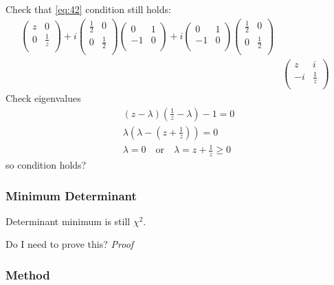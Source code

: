\documentclass[11pt,a4paper]{article}
\numberwithin{equation}{section}
\begin{document}
	Check that \ref{eq:42} condition still holds:
	\begin{align*}
	\begin{pmatrix}
	z & 0  \\
	0 & \frac{1}{z}\\
	\end{pmatrix} + i\begin{pmatrix}
	\frac{1}{2} & 0  \\
	0 & \frac{1}{2} \\
	\end{pmatrix}\begin{pmatrix}
	0 & 1  \\
	-1 & 0 \\
	\end{pmatrix} + i\begin{pmatrix}
	0 & 1  \\
	-1 & 0 \\
	\end{pmatrix}\begin{pmatrix}
	\frac{1}{2} & 0  \\
	0 & \frac{1}{2} \\
	\end{pmatrix}&\\
	&\begin{pmatrix}
	z & i  \\
	-i & \frac{1}{z} \\
	\end{pmatrix}&
	\end{align*}
	Check eigenvalues
	\begin{align*}
	&(z- \lambda)(\frac{1}{z} - \lambda) - 1 = 0&\\
	&\lambda(\lambda - (z+ \frac{1}{z})) = 0&\\
	&\lambda = 0\quad\text{or}\quad\lambda= z+ \frac{1}{z} \geq 0&\tag*{as $z \geq 1$}
	\end{align*} so condition holds? 
	
	\subsubsection{Minimum Determinant}
	Determinant minimum is still $\chi^{2}$.
	
	\color{red}Do I need to prove this? \emph{Proof}\color{black}

	\color{red}\subsubsection{Method}\color{black}
\end{document}
